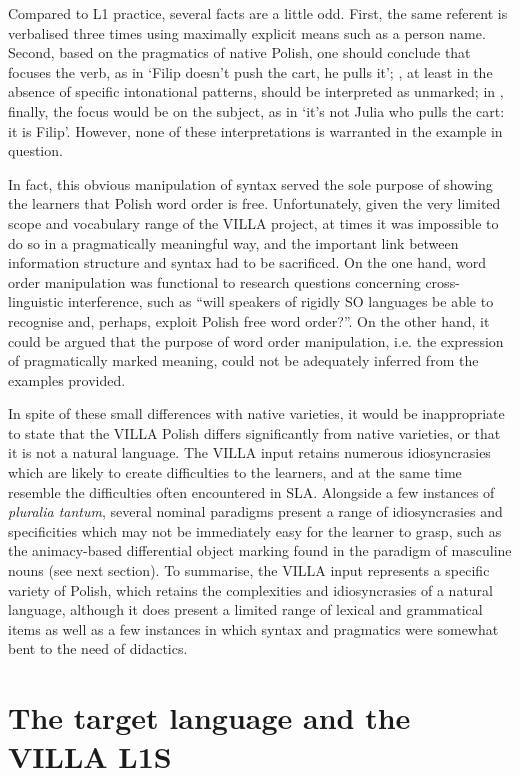 Compared to L1 practice, several facts are a little odd. First, the same referent is verbalised three times using maximally explicit means such as a person name. Second, based on the pragmatics of native Polish, one should conclude that  focuses the verb, as in ‘Filip doesn't push the cart, he pulls it’; , at least in the absence of specific intonational patterns, should be interpreted as unmarked; in , finally, the focus would be on the subject, as in ‘it's not Julia who pulls the cart: it is Filip’. However, none of these interpretations is warranted in the example in question.

In fact, this obvious manipulation of syntax served the sole purpose of showing the learners that Polish word order is free. Unfortunately, given the very limited scope and vocabulary range of the VILLA project, at times it was impossible to do so in a pragmatically meaningful way, and the important link between information structure and syntax had to be sacrificed. On the one hand, word order manipulation was functional to research questions concerning cross-linguistic interference, such as “will speakers of rigidly SO languages be able to recognise and, perhaps, exploit Polish free word order?”. On the other hand, it could be argued that the purpose of word order manipulation, i.e. the expression of pragmatically marked meaning, could not be adequately inferred from the examples provided. 

In spite of these small differences with native varieties, it would be inappropriate to state that the VILLA Polish differs significantly from native varieties, or that it is not a natural language. The VILLA input retains numerous idiosyncrasies which are likely to create difficulties to the learners, and at the same time resemble the difficulties often encountered in SLA. Alongside a few instances of \textit{pluralia tantum}, several nominal paradigms present a range of idiosyncrasies and specificities which may not be immediately easy for the learner to grasp, such as the animacy-based differential object marking found in the paradigm of masculine nouns (see next section). To summarise, the VILLA input represents a specific variety of Polish, which retains the complexities and idiosyncrasies of a natural language, although it does present a limited range of lexical and grammatical items as well as a few instances in which syntax and pragmatics were somewhat bent to the need of didactics.

\section{The target language and the VILLA L1S}\label{sec:02:2}
